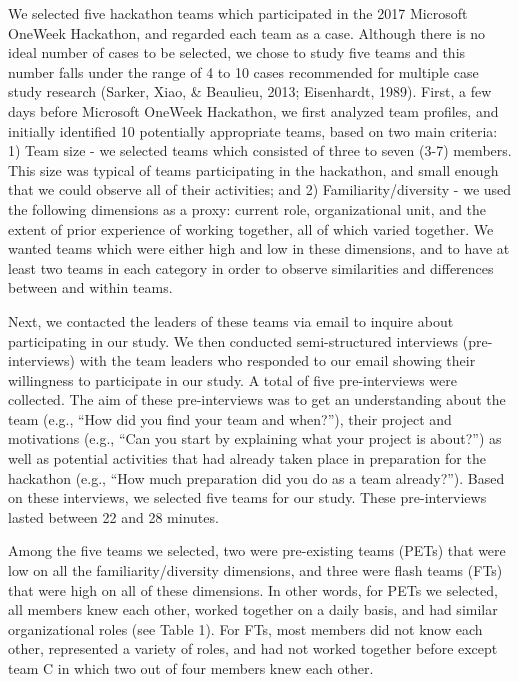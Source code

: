 \documentclass{hcij}
\begin{document}
We selected five hackathon teams which participated in the 2017 Microsoft OneWeek Hackathon, and regarded each team as a case. Although there is no ideal number of cases to be selected, we chose to study five teams and this number falls under the range of 4 to 10 cases recommended for multiple case study research (Sarker, Xiao, & Beaulieu, 2013; Eisenhardt, 1989). First, a few days before Microsoft OneWeek Hackathon, we first analyzed team profiles, and initially identified 10 potentially appropriate teams, based on two main criteria: 1) Team size - we selected teams which consisted of three to seven (3-7) members. This size was typical of teams participating in the hackathon, and small enough that we could observe all of their activities; and 2) Familiarity/diversity - we used the following dimensions as a proxy: current role, organizational unit, and the extent of prior experience of working together, all of which varied together. We wanted teams which were either high and low in these dimensions, and to have at least two teams in each category in order to observe similarities and differences between and within teams.

Next, we contacted the leaders of these teams via email to inquire about participating in our study. We then conducted semi-structured interviews (pre-interviews) with the team leaders who responded to our email showing their willingness to participate in our study. A total of five pre-interviews were collected. The aim of these pre-interviews was to get an understanding about the team (e.g., “How did you find your team and when?”), their project and motivations (e.g., “Can you start by explaining what your project is about?”) as well as potential activities that had already taken place in preparation for the hackathon (e.g., “How much preparation did you do as a team already?”). Based on these interviews, we selected five teams for our study. These pre-interviews lasted between 22 and 28 minutes.

Among the five teams we selected, two were pre-existing teams (PETs) that were low on all the familiarity/diversity dimensions, and three were flash teams (FTs) that were high on all of these dimensions. In other words, for PETs we selected, all members knew each other, worked together on a daily basis, and had similar organizational roles (see Table 1). For FTs, most members did not know each other, represented a variety of roles, and had not worked together before except team C in which two out of four members knew each other.
\end{document}
